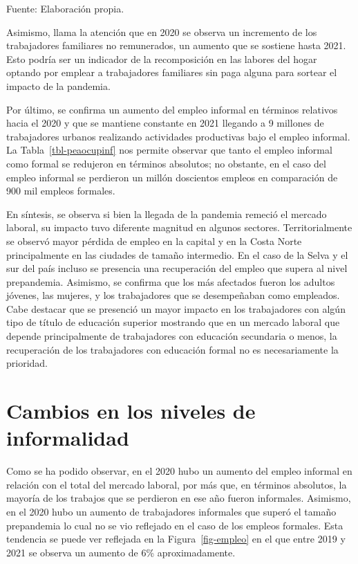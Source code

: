 \documentclass[
  letterpaper,
  12pt,
  oneside,
  spanish,
  doublespacing,
  headsepline,
  parskip]{MastersDoctoralThesis}
\begin{document}
\noindent \small Fuente: Elaboración propia. \normalsize

Asimismo, llama la atención que en 2020 se observa un incremento de los
trabajadores familiares no remunerados, un aumento que se sostiene hasta
2021. Esto podría ser un indicador de la recomposición en las labores
del hogar optando por emplear a trabajadores familiares sin paga alguna
para sortear el impacto de la pandemia.

Por último, se confirma un aumento del empleo informal en términos
relativos hacia el 2020 y que se mantiene constante en 2021 llegando a 9
millones de trabajadores urbanos realizando actividades productivas bajo
el empleo informal. La Tabla~\ref{tbl-peaocupinf} nos permite observar
que tanto el empleo informal como formal se redujeron en términos
absolutos; no obstante, en el caso del empleo informal se perdieron un
millón doscientos empleos en comparación de 900 mil empleos formales.

En síntesis, se observa si bien la llegada de la pandemia remeció el
mercado laboral, su impacto tuvo diferente magnitud en algunos sectores.
Territorialmente se observó mayor pérdida de empleo en la capital y en
la Costa Norte principalmente en las ciudades de tamaño intermedio. En
el caso de la Selva y el sur del país incluso se presencia una
recuperación del empleo que supera al nivel prepandemia. Asimismo, se
confirma que los más afectados fueron los adultos jóvenes, las mujeres,
y los trabajadores que se desempeñaban como empleados. Cabe destacar que
se presenció un mayor impacto en los trabajadores con algún tipo de
título de educación superior mostrando que en un mercado laboral que
depende principalmente de trabajadores con educación secundaria o menos,
la recuperación de los trabajadores con educación formal no es
necesariamente la prioridad.

\hypertarget{cambios-en-los-niveles-de-informalidad}{%
\section{Cambios en los niveles de
informalidad}\label{cambios-en-los-niveles-de-informalidad}}

Como se ha podido observar, en el 2020 hubo un aumento del empleo
informal en relación con el total del mercado laboral, por más que, en
términos absolutos, la mayoría de los trabajos que se perdieron en ese
año fueron informales. Asimismo, en el 2020 hubo un aumento de
trabajadores informales que superó el tamaño prepandemia lo cual no se
vio reflejado en el caso de los empleos formales. Esta tendencia se
puede ver reflejada en la Figura~\ref{fig-empleo} en el que entre 2019 y
2021 se observa un aumento de 6\% aproximadamente.
\end{document}
